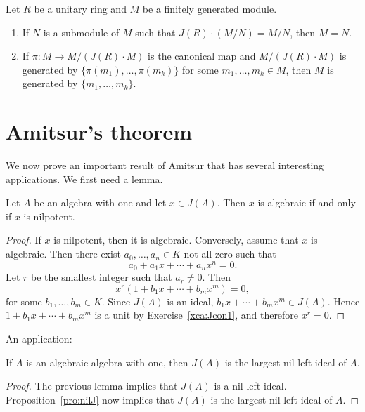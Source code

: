 \begin{exercise}
\label{xca:Nakayama}
    Let $R$ be a unitary ring and $M$ be a finitely
    generated module. 
    \begin{enumerate}
        \item If $N$ is a submodule of $M$ such that $J(R)\cdot (M/N)=M/N$, then $M=N$. 
        \item If $\pi\colon M\to M/(J(R)\cdot M)$ is the canonical map and 
            $M/(J(R)\cdot M)$ is generated by $\{\pi(m_1),\dots,\pi(m_k)\}$ for some 
            $m_1,\dots,m_k\in M$, then $M$ is generated by $\{m_1,\dots,m_k\}$. 
    \end{enumerate}
\end{exercise}


\section{Amitsur's theorem}

\lecture 
We now prove an important result of Amitsur that
has several interesting applications. We first need a lemma. 

\begin{lemma}
	\label{lemma:algebraico=nil}
	Let $A$ be an algebra with one and let $x\in J(A)$. 
	Then $x$ is algebraic if and only if $x$ is nilpotent. 
\end{lemma}

\begin{proof}
    If $x$ is nilpotent, then it is algebraic. Conversely, assume that
    $x$ is algebraic.
    Then there exist $a_0,\dots,a_n\in K$ 
    not all zero such that 
    \[
		a_0+a_1x+\cdots+a_nx^n=0.
	\]
	Let $r$ be the smallest integer such that $a_r\ne 0$. Then 
	\[
		x^r(1+b_1x+\cdots+b_mx^m)=0,
	\]
	for some $b_1,\dots,b_m\in K$. 
    Since $J(A)$ is an ideal, $b_1x+\cdots+b_mx^m\in J(A)$. Hence $1+b_1x+\cdots+b_mx^m$ is a unit by
    Exercise~\ref{xca:Jcon1}, and therefore $x^r=0$.
\end{proof}

An application:

\begin{proposition}
	\label{pro:algebraica=>Jnil}
	If $A$ is an algebraic algebra with one, then $J(A)$ is the largest nil left ideal of $A$.
\end{proposition}

\begin{proof}
	The previous lemma implies that $J(A)$ is a nil left ideal. 
	Proposition~\ref{pro:nilJ} now implies that $J(A)$ is the largest nil left ideal of $A$. 
\end{proof}

